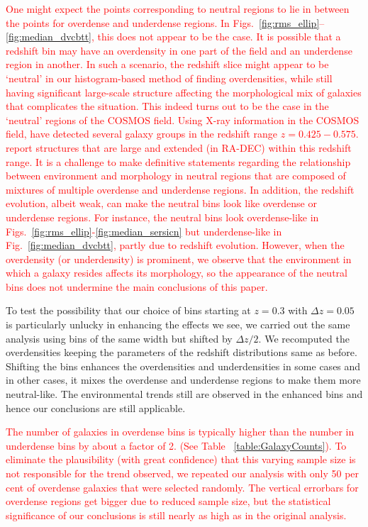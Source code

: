 \documentclass[twocolumn,useAMS,usenatbib]{mn2e}
\newcommand{\new}[1]{{\textcolor{red}{#1}}}
\begin{document}
\new{
One might expect the points corresponding to neutral regions to lie in between the points for overdense and underdense regions. 
In Figs.~\ref{fig:rms_ellip}--\ref{fig:median_dvcbtt}, this does not appear to be the case. 
It is possible that a redshift bin may have an overdensity in one part of the field and an
underdense region in another. 
In such a scenario, the redshift slice might appear to be `neutral' in our histogram-based method of
finding overdensities, while still having significant large-scale structure affecting the
morphological mix of galaxies that complicates the situation. 
This indeed turns out to be the case
in the `neutral' regions of the COSMOS field.
Using X-ray information in the COSMOS field, \cite{COSMOS_XRAY} have detected several galaxy groups in the
redshift range $z=0.425-0.575$.}
\new{\cite{Kovac_Density10k} report structures that are large and extended (in RA-DEC) within this redshift range. 
It is a challenge to make definitive statements regarding the relationship between environment and
morphology in neutral regions that are composed of mixtures of multiple overdense and underdense regions. 
In addition, the redshift evolution, albeit weak, can make the neutral bins look like overdense or underdense regions.
For instance, the neutral bins look overdense-like in Figs.~\ref{fig:rms_ellip}-\ref{fig:median_sersicn} but underdense-like
in Fig.~\ref{fig:median_dvcbtt}, partly due to redshift evolution.
However, when the overdensity (or underdensity) is prominent, we observe that the environment in
which a galaxy resides affects its morphology, so the appearance of the neutral bins does not
undermine the main conclusions of this paper.
}

To test the possibility that our choice of bins starting at $z=0.3$ with $\Delta z = 0.05$ is particularly unlucky in enhancing the effects we see, 
we carried out the same analysis using bins of the same width but shifted by $\Delta z/2$. We recomputed the overdensities keeping the parameters of the redshift distributions same as before.
Shifting the bins enhances the overdensities and underdensities in some cases and in other cases, it mixes the overdense and underdense regions to make them more neutral-like. 
The environmental trends still are observed in the enhanced bins and hence our conclusions are still applicable. 

\new{The number of galaxies in overdense bins is typically higher than the number in underdense bins by about a factor of 2. (See Table ~\ref{table:GalaxyCounts}). 
To eliminate the plausibility (with great confidence) that this varying sample size is not responsible for the trend observed, we repeated our analysis with only 50 per cent of overdense galaxies that were selected randomly. 
The vertical errorbars for overdense regions get bigger due to reduced sample size, but  the
statistical significance of our conclusions is still nearly as high as in the original analysis.}
\end{document}
